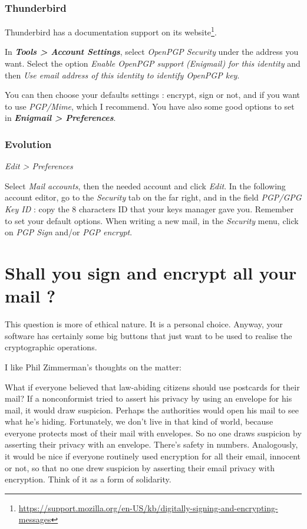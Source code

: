 \subsubsection{Thunderbird}\label{thunderbird}
Thunderbird has a documentation support on its website\footnote{\url{https://support.mozilla.org/en-US/kb/digitally-signing-and-encrypting-messages}}.

In \textbf{\emph{Tools \textgreater{} Account Settings}}, select
\emph{OpenPGP Security} under the address you want. Select the option
\emph{Enable OpenPGP support (Enigmail) for this identity} and then
\emph{Use email address of this identity to identify OpenPGP key}.

You can then choose your defaults settings : encrypt, sign or not, and
if you want to use \emph{PGP/Mime}, which I recommend. You have also some good options to set in \textbf{\emph{Enigmail \textgreater{} Preferences}}.

\subsubsection{Evolution}\label{evolution}
\emph{Edit \textgreater{} Preferences}

Select \emph{Mail accounts}, then the needed account and click
\emph{Edit}. In the following account editor, go to the \emph{Security}
tab on the far right, and in the field \emph{PGP/GPG Key ID} : copy the
8 characters ID that your keys manager gave you. Remember to set your
default options. When writing a new mail, in the \emph{Security} menu, click on \emph{PGP
Sign} and/or \emph{PGP encrypt}.

\section{Shall you sign and encrypt all your mail ?}\label{shall-you-sign-and-encrypt-all-your-mail}

This question is more of ethical nature. It is a personal choice. Anyway, your software has certainly some big buttons that just want to
be used to realise the cryptographic operations.

I like Phil Zimmerman's thoughts on the matter:

\begin{quoting}
What if everyone believed that law-abiding citizens should use postcards
for their mail? If a nonconformist tried to assert his privacy by using
an envelope for his mail, it would draw suspicion. Perhaps the
authorities would open his mail to see what he's hiding. Fortunately, we
don't live in that kind of world, because everyone protects most of
their mail with envelopes. So no one draws suspicion by asserting their
privacy with an envelope. There's safety in numbers. Analogously, it
would be nice if everyone routinely used encryption for all their email,
innocent or not, so that no one drew suspicion by asserting their email
privacy with encryption. Think of it as a form of solidarity.
\end{quoting}

